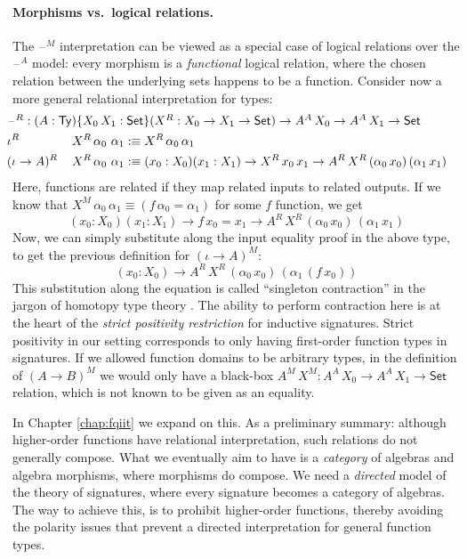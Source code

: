 \documentclass[12pt,a4paper,twoside,openany]{book}
\theoremstyle{remark}
\theoremstyle{definition}
\newcommand{\Ty}{\mathsf{Ty}}
\newcommand{\blank}{\mathord{\hspace{1pt}\text{--}\hspace{1pt}}}
\newcommand{\Set}{\mathsf{Set}}
\newcommand{\defn}{:\equiv}
\begin{document}
\paragraph{Morphisms vs.\ logical relations.}
The $\blank^M$ interpretation can be viewed as a special case of logical
relations over the $\blank^A$ model: every morphism is a \emph{functional}
logical relation, where the chosen relation between the underlying sets happens
to be a function. Consider now a more general relational interpretation for
types:
\begin{alignat*}{3}
  & \hspace{-0.5em}\rlap{$\blank^R : (A : \Ty)\{X_0\,X_1 : \Set\}(X^R : X_0 \to X_1 \to \Set) \to A^A\,X_0 \to A^A\,X_1 \to \Set$}\\
  & \hspace{-0.5em}\iota^R\,&&X^R\,\alpha_0\,\,\alpha_1 \defn X^R\,\alpha_0\,\alpha_1 \\
  & \hspace{-0.5em}(\iota\to A)^R\,&&X^R\,\alpha_0\,\,\alpha_1 \defn
       (x_0 : X_0)(x_1 : X_1) \to X^R\,x_0\,x_1 \to A^R\,X^R\,(\alpha_0\,x_0)\,(\alpha_1\,x_1)
\end{alignat*}
Here, functions are related if they map related inputs to related outputs. If we
know that $X^M\,\alpha_0\,\alpha_1 \equiv (f\,\alpha_0 = \alpha_1)$ for some $f$
function, we get
\[
  (x_0 : X_0)(x_1 : X_1) \to f\,x_0 = x_1 \to A^R\,X^R\,(\alpha_0\,x_0)\,(\alpha_1\,x_1)
\]
Now, we can simply substitute along the input equality proof in the above type,
to get the previous definition for $(\iota \to A)^M$:
\[
  (x_0 : X_0) \to A^R\,X^R\,(\alpha_0\,x_0)\,(\alpha_1\,(f\,x_0))
\]
This substitution along the equation is called ``singleton contraction'' in the
jargon of homotopy type theory \cite{hottbook}. The ability to perform contraction
here is at the heart of the \emph{strict positivity restriction} for inductive
signatures. Strict positivity in our setting corresponds to only having
first-order function types in signatures. If we allowed function domains to be
arbitrary types, in the definition of $(A \to B)^M$ we would only have a
black-box $A^M\,X^M : A^A\,X_0 \to A^A\,X_1 \to \Set$ relation, which is not
known to be given as an equality.

In Chapter \ref{chap:fqiit} we expand on this. As a preliminary summary:
although higher-order functions have relational interpretation, such relations
do not generally compose. What we eventually aim to have is a \emph{category} of
algebras and algebra morphisms, where morphisms do compose. We need a
\emph{directed} model of the theory of signatures, where every signature becomes
a category of algebras. The way to achieve this, is to prohibit higher-order
functions, thereby avoiding the polarity issues that prevent a directed
interpretation for general function types.
\end{document}
